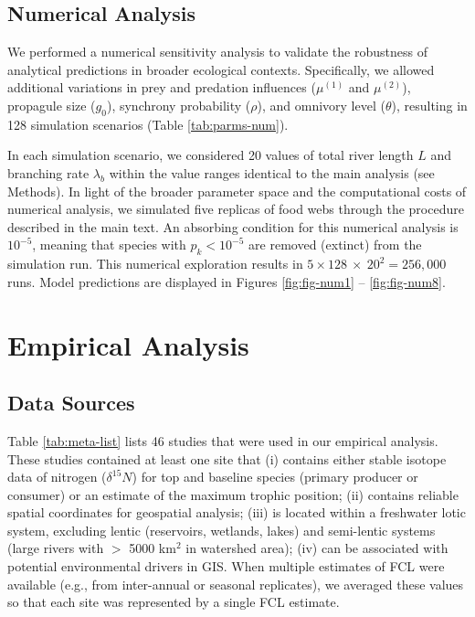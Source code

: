 \documentclass[11pt, class=article, crop=false]{standalone}
\theoremstyle{definition}
\begin{document}
\newpage

\subsection{Numerical Analysis}

We performed a numerical sensitivity analysis to validate the robustness of analytical predictions in broader ecological contexts.
Specifically, we allowed additional variations in prey and predation influences ($\mu^{(1)}$ and $\mu^{(2)}$), propagule size ($g_0$), synchrony probability ($\rho$), and omnivory level ($\theta$), resulting in 128 simulation scenarios (Table \ref{tab:parms-num}).

In each simulation scenario, we considered 20 values of total river length $L$ and branching rate $\lambda_b$ within the value ranges identical to the main analysis (see Methods).
In light of the broader parameter space and the computational costs of numerical analysis, we simulated five replicas of food webs through the procedure described in the main text.
An absorbing condition for this numerical analysis is $10^{-5}$, meaning that species with $p_k < 10^{-5}$ are removed (extinct) from the simulation run.
This numerical exploration results in $5 \times 128~\times~20^2 = 256,000$ runs.
Model predictions are displayed in Figures \ref{fig:fig-num1} -- \ref{fig:fig-num8}.



\newpage



\section{Empirical Analysis}

\subsection{Data Sources}

Table \ref{tab:meta-list} lists 46 studies that were used in our empirical analysis.
These studies contained at least one site that (i) contains either stable isotope data of nitrogen ($\delta^{15}N$) for top and baseline species (primary producer or consumer) or an estimate of the maximum trophic position; (ii) contains reliable spatial coordinates for geospatial analysis; (iii) is located within a freshwater lotic system, excluding lentic (reservoirs, wetlands, lakes) and semi-lentic systems (large rivers with $>$ 5000 km$^2$ in watershed area); (iv) can be associated with potential environmental drivers in GIS.
When multiple estimates of FCL were available (e.g., from inter-annual or seasonal replicates), we averaged these values so that each site was represented by a single FCL estimate.
\end{document}
